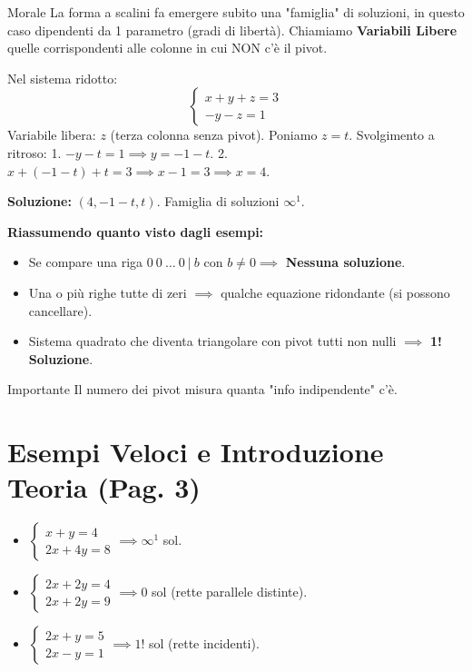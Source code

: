 \begin{note}{Morale}{}
La forma a scalini fa emergere subito una "famiglia" di soluzioni, in questo caso dipendenti da 1 parametro (gradi di libertà).
Chiamiamo \textbf{Variabili Libere} quelle corrispondenti alle colonne in cui NON c'è il pivot.
\end{note}

Nel sistema ridotto:
\[
\begin{cases}
x+y+z=3 \\
-y-z=1
\end{cases}
\]
Variabile libera: $z$ (terza colonna senza pivot). Poniamo $z = t$.
Svolgimento a ritroso:
1. $-y - t = 1 \implies y = -1 - t$.
2. $x + (-1-t) + t = 3 \implies x - 1 = 3 \implies x = 4$.

\textbf{Soluzione:} $(4, -1-t, t)$.
Famiglia di soluzioni $\infty^1$.

\textbf{Riassumendo quanto visto dagli esempi:}
\begin{itemize}
    \item Se compare una riga $0 \ 0 \ \dots \ 0 \ | \ b$ con $b \neq 0 \implies$ \textbf{Nessuna soluzione}.
    \item Una o più righe tutte di zeri $\implies$ qualche equazione ridondante (si possono cancellare).
    \item Sistema quadrato che diventa triangolare con pivot tutti non nulli $\implies$ \textbf{1! Soluzione}.
\end{itemize}

\begin{note}{Importante}{}
Il numero dei pivot misura quanta "info indipendente" c'è.
\end{note}

\section{Esempi Veloci e Introduzione Teoria (Pag. 3)}

\begin{itemize}
    \item $\begin{cases} x+y=4 \\ 2x+4y=8 \end{cases} \implies \infty^1$ sol.
    \item $\begin{cases} 2x+2y=4 \\ 2x+2y=9 \end{cases} \implies 0$ sol (rette parallele distinte).
    \item $\begin{cases} 2x+y=5 \\ 2x-y=1 \end{cases} \implies 1!$ sol (rette incidenti).
\end{itemize}

